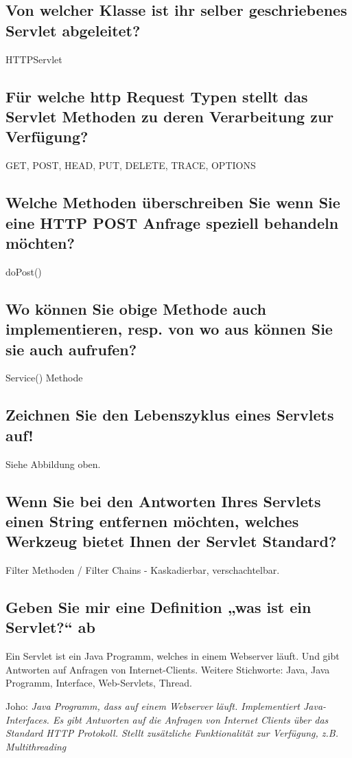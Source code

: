 \subsection{Von welcher Klasse ist ihr selber geschriebenes Servlet abgeleitet?}
HTTPServlet

\subsection{Für welche http Request Typen stellt das Servlet Methoden zu deren Verarbeitung zur Verfügung?}
GET, POST, HEAD, PUT, DELETE, TRACE, OPTIONS

\subsection{Welche Methoden überschreiben Sie wenn Sie eine HTTP POST Anfrage speziell behandeln möchten?}
doPost()

\subsection{Wo können Sie obige Methode auch implementieren, resp. von wo aus können Sie sie auch aufrufen?}
Service() Methode

\subsection{Zeichnen Sie den Lebenszyklus eines Servlets auf!}
Siehe Abbildung oben.

\subsection{Wenn Sie bei den Antworten Ihres Servlets einen String entfernen möchten, welches Werkzeug bietet Ihnen der Servlet Standard?}
Filter Methoden / Filter Chains - Kaskadierbar, verschachtelbar.

\subsection{Geben Sie mir eine Definition „was ist ein Servlet?“ ab}
Ein Servlet ist ein Java Programm, welches in einem Webserver läuft. Und gibt Antworten auf Anfragen von Internet-Clients. Weitere Stichworte: Java, Java Programm, Interface, Web-Servlets, Thread. 

Joho: \emph{Java Programm, dass auf einem Webserver läuft. Implementiert Java-Interfaces. Es gibt Antworten auf die Anfragen von Internet Clients über das Standard HTTP Protokoll. Stellt zusätzliche Funktionalität zur Verfügung, z.B. Multithreading}

